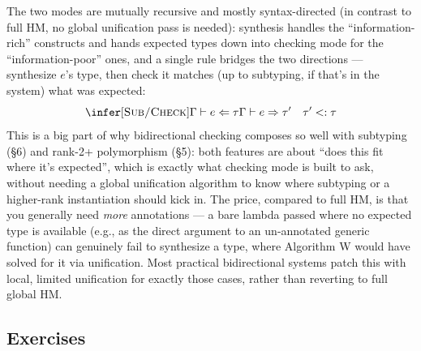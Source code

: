 The two modes are mutually recursive and mostly syntax-directed (in contrast to full HM, no global unification pass is needed): synthesis handles the ``information-rich'' constructs and hands expected types down into checking mode for the ``information-poor'' ones, and a single rule bridges the two directions — synthesize $e$'s type, then check it matches (up to subtyping, if that's in the system) what was expected:
\[
\infer[\textsc{Sub/Check}]
  {\Gamma \vdash e \Leftarrow \tau}
  {\Gamma \vdash e \Rightarrow \tau' \quad \tau' <: \tau}
\]
This is a big part of why bidirectional checking composes so well with subtyping (\S6) and rank-2+ polymorphism (\S5): both features are about ``does this fit where it's expected'', which is exactly what checking mode is built to ask, without needing a global unification algorithm to know where subtyping or a higher-rank instantiation should kick in. The price, compared to full HM, is that you generally need \emph{more} annotations — a bare lambda passed where no expected type is available (e.g., as the direct argument to an un-annotated generic function) can genuinely fail to synthesize a type, where Algorithm W would have solved for it via unification. Most practical bidirectional systems patch this with local, limited unification for exactly those cases, rather than reverting to full global HM.

\subsection{Exercises}

